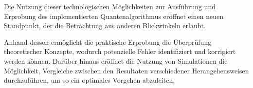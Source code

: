 Die Nutzung dieser technologischen Möglichkeiten zur Ausführung und Erprobung des implementierten Quantenalgorithmus eröffnet einen neuen Standpunkt, 
der die Betrachtung aus anderen Blickwinkeln erlaubt. 

Anhand dessen ermöglicht die praktische Erprobung die Überprüfung theoretischer Konzepte,
wodurch potenzielle Fehler identifiziert und korrigiert werden können.
Darüber hinaus eröffnet die Nutzung von Simulationen die Möglichkeit,
Vergleiche zwischen den Resultaten verschiedener Herangehensweisen durchzuführen, 
um so ein optimales Vorgehen abzuleiten.


